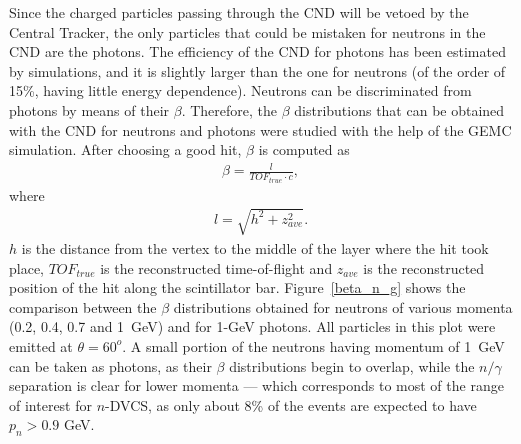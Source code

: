Since the charged particles passing through the CND will be vetoed by the Central Tracker, the only particles that could be mistaken for neutrons in the CND are the photons. The efficiency of the CND for photons has been estimated by simulations, and it is slightly larger than the one for neutrons (of the order of 15\%, having little energy dependence). 
Neutrons can be discriminated from photons by means of their $\beta$.
Therefore, the $\beta$ distributions that can be obtained with the CND for neutrons and photons were studied with the help of the GEMC simulation.
After choosing a good hit, $\beta$ is computed as  %
%
\begin{eqnarray}\label{beta_def}
\beta = \frac{l}{TOF_{true}\cdot c},
\end{eqnarray}
%
where 
\begin{eqnarray}\label{l_def} 
l = \sqrt{h^{2}+z_{ave}^{2}}.
\end{eqnarray}
%
$h$ is the distance from the vertex to the middle of the layer where the hit took place, $TOF_{true}$ is the reconstructed time-of-flight and $z_{ave}$ is the reconstructed position of the hit along the scintillator bar. %
%
Figure~\ref{beta_n_g} shows the comparison between the $\beta$ distributions obtained for neutrons of various momenta (0.2, 0.4, 0.7 and 1~GeV) and for 1-GeV photons. All particles in this plot were emitted at $\theta = 60^o$.
A small portion of the neutrons having momentum of 1~GeV can be taken as photons, as their $\beta$ distributions begin to overlap, while the $n/\gamma$ separation is clear for lower momenta --- which corresponds to most of the range of interest for $n$-DVCS, as only about 8\% of the events are expected to have $p_n>0.9$ GeV.
%
